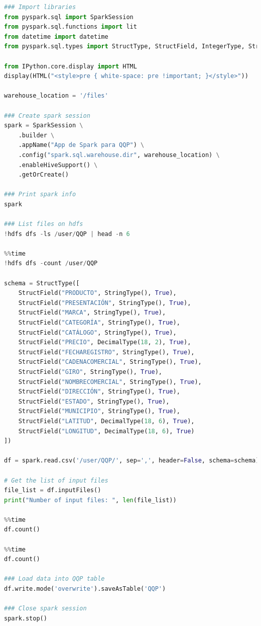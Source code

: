 \documentclass{article}
\begin{document}
\begin{lstlisting}[language=Python]
### Import libraries
from pyspark.sql import SparkSession
from pyspark.sql.functions import lit
from datetime import datetime
from pyspark.sql.types import StructType, StructField, IntegerType, StringType, DecimalType

from IPython.core.display import HTML
display(HTML("<style>pre { white-space: pre !important; }</style>"))

warehouse_location = '/files'

### Create spark session
spark = SparkSession \
    .builder \
    .appName("App de Spark para QQP") \
    .config("spark.sql.warehouse.dir", warehouse_location) \
    .enableHiveSupport() \
    .getOrCreate()

### Print spark info
spark

### List files on hdfs
!hdfs dfs -ls /user/QQP | head -n 6

%%time
!hdfs dfs -count /user/QQP

schema = StructType([
    StructField("PRODUCTO", StringType(), True),
    StructField("PRESENTACIÓN", StringType(), True),
    StructField("MARCA", StringType(), True),
    StructField("CATEGORÍA", StringType(), True),
    StructField("CATÁLOGO", StringType(), True),
    StructField("PRECIO", DecimalType(18, 2), True),
    StructField("FECHAREGISTRO", StringType(), True),
    StructField("CADENACOMERCIAL", StringType(), True),
    StructField("GIRO", StringType(), True),
    StructField("NOMBRECOMERCIAL", StringType(), True),
    StructField("DIRECCIÓN", StringType(), True),
    StructField("ESTADO", StringType(), True),
    StructField("MUNICIPIO", StringType(), True),
    StructField("LATITUD", DecimalType(18, 6), True),
    StructField("LONGITUD", DecimalType(18, 6), True)
])

df = spark.read.csv('/user/QQP/', sep=',', header=False, schema=schema)

# Get the list of input files
file_list = df.inputFiles()
print("Number of input files: ", len(file_list))

%%time
df.count()

%%time
df.count()

### Load data into QQP table
df.write.mode('overwrite').saveAsTable('QQP')

### Close spark session
spark.stop()

\end{lstlisting}

\newpage
\end{document}
